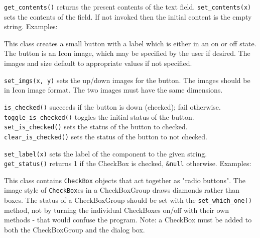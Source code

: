 \texttt{get\_contents()} returns the present contents of the text field.
\texttt{set\_contents(x)} sets the contents of the field. If not invoked then
the initial content is the empty string. Examples:



This class creates a small button with a label which is either
in an on or off state. The button is an Icon image, which may be
specified by the user if desired. The images and size default to
appropriate values if not specified.

\texttt{set\_imgs(x, y)} sets the up/down images for the button. The images
should be in Icon image format. The two images must have the same
dimensions.

\texttt{is\_checked()} succeeds if the button is down (checked); fail
otherwise.\\
\texttt{toggle\_is\_checked()} toggles the initial status of the button.\\
\texttt{set\_is\_checked()} sets the status of the button to checked.\\
\texttt{clear\_is\_checked()} sets the status of the button to not checked.

\texttt{set\_label(x)} sets the label of the component to the given
string.\\
\texttt{get\_status()} returns 1 if the CheckBox is checked,
\texttt{\&null} otherwise.
Examples:



This class contains \texttt{CheckBox} objects that act together as
"radio buttons". The image style of \texttt{CheckBox}es in a
CheckBoxGroup draws diamonds rather
than boxes. The status of a CheckBoxGroup should be set with the
\texttt{set\_which\_one()} method, not by turning the individual CheckBoxes
on/off with their own methods - that would confuse the program. Note: a
CheckBox must be added to both the CheckBoxGroup and the dialog box.

